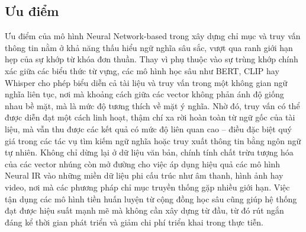 \subsection{Ưu điểm}
Ưu điểm của mô hình Neural Network-based trong xây dựng chỉ mục và truy vấn thông tin nằm ở khả năng thấu hiểu ngữ nghĩa sâu sắc, vượt qua ranh giới hạn hẹp của sự khớp từ khóa đơn thuần. Thay vì phụ thuộc vào sự trùng khớp chính xác giữa các biểu thức từ vựng, các mô hình học sâu như BERT, CLIP hay Whisper cho phép biểu diễn cả tài liệu và truy vấn trong một không gian ngữ nghĩa liên tục, nơi mà khoảng cách giữa các vector không phản ánh độ giống nhau bề mặt, mà là mức độ tương thích về mặt ý nghĩa. Nhờ đó, truy vấn có thể được diễn đạt một cách linh hoạt, thậm chí xa rời hoàn toàn từ ngữ gốc của tài liệu, mà vẫn thu được các kết quả có mức độ liên quan cao -- điều đặc biệt quý giá trong các tác vụ tìm kiếm ngữ nghĩa hoặc truy xuất thông tin bằng ngôn ngữ tự nhiên. Không chỉ dừng lại ở dữ liệu văn bản, chính tính chất trừu tượng hóa của các vector nhúng còn mở đường cho việc áp dụng hiệu quả các mô hình Neural IR vào những miền dữ liệu phi cấu trúc như âm thanh, hình ảnh hay video, nơi mà các phương pháp chỉ mục truyền thống gặp nhiều giới hạn. Việc tận dụng các mô hình tiền huấn luyện từ cộng đồng học sâu cũng giúp hệ thống đạt được hiệu suất mạnh mẽ mà không cần xây dựng từ đầu, từ đó rút ngắn đáng kể thời gian phát triển và giảm chi phí triển khai trong thực tiễn.
